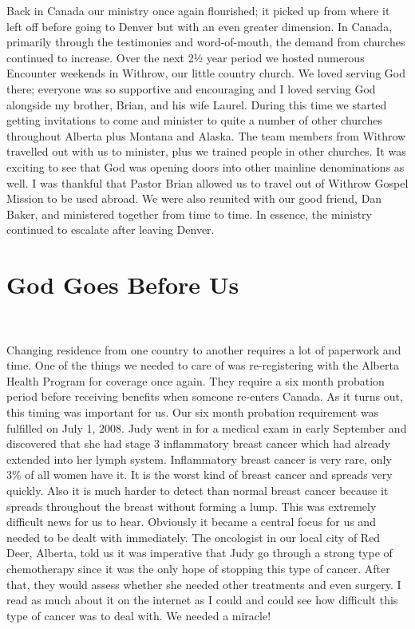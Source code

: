 \documentclass[oneside]{book}
\begin{document}
Back in Canada our ministry once again flourished; it picked up from where it left off before going to Denver but with an even greater dimension. In Canada, primarily through the testimonies and word-of-mouth, the demand from churches continued to increase. Over the next 2½ year period we hosted numerous Encounter weekends in Withrow, our little country church. We loved serving God there; everyone was so supportive and encouraging and I loved serving God alongside my brother, Brian, and his wife Laurel. During this time we started getting invitations to come and minister to quite a number of other churches throughout Alberta plus Montana and Alaska. The team members from Withrow travelled out with us to minister, plus we trained people in other churches. It was exciting to see that God was opening doors into other mainline denominations as well. I was thankful that Pastor Brian allowed us to travel out of Withrow Gospel Mission to be used abroad. We were also reunited with our good friend, Dan Baker, and ministered together from time to time. In essence, the ministry continued to escalate after leaving Denver.


\section{God Goes Before Us}
\

Changing residence from one country to another requires a lot of paperwork and time. One of the things we needed to care of was re-registering with the Alberta Health Program for coverage once again. They require a six month probation period before receiving benefits when someone re-enters Canada. As it turns out, this timing was important for us. Our six month probation requirement was fulfilled on July 1, 2008. Judy went in for a medical exam in early September and discovered that she had stage 3 inflammatory breast cancer which had already extended into her lymph system. Inflammatory breast cancer is very rare, only 3\% of all women have it. It is the worst kind of breast cancer and spreads very quickly. Also it is much harder to detect than normal breast cancer because it spreads throughout the breast without forming a lump. This was extremely difficult news for us to hear. Obviously it became a central focus for us and needed to be dealt with immediately. The oncologist in our local city of Red Deer, Alberta, told us it was imperative that Judy go through a strong type of chemotherapy since it was the only hope of stopping this type of cancer. After that, they would assess whether she needed other treatments and even surgery. I read as much about it on the internet as I could and could see how difficult this type of cancer was to deal with. We needed a miracle!
\end{document}
